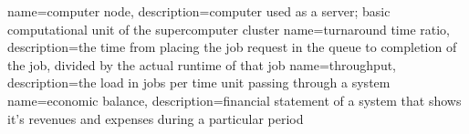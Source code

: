
{
	name=computer node,
	description={computer used as a server; basic computational unit of the supercomputer cluster}
}
{
	name=turnaround time ratio,
	description={the time from placing the job request in the queue to completion of the job, divided by the actual runtime of that job}
}
{
	name=throughput,
	description={the load in jobs per time unit passing through a system}
}
{
	name=economic balance,
	description={financial statement of a system that shows it’s revenues and expenses during a particular period}
}
